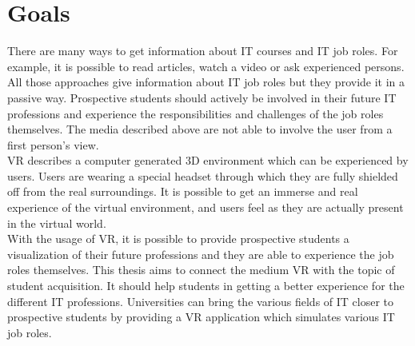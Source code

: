 \section{Goals}
There are many ways to get information about IT courses and IT job roles. For example, it is possible to read articles, watch a video or ask experienced persons. All those approaches give information about IT job roles but they provide it in a passive way. Prospective students should actively be involved in their future IT professions and experience the responsibilities and challenges of the job roles themselves. The media described above are not able to involve the user from a first person's view. \\
VR describes a computer generated 3D environment which can be experienced by users. Users are wearing a special headset through which they are fully shielded off from the real surroundings. It is possible to get an immerse and real experience of the virtual environment, and users feel as they are actually present in the virtual world. \cite{Linowes.2015}\\
With the usage of VR, it is possible to provide prospective students a visualization of their future professions and they are able to experience the job roles themselves. This thesis aims to connect the medium VR with the topic of student acquisition. It should help students in getting a better experience for the different IT professions. Universities can bring the various fields of IT closer to prospective students by providing a VR application which simulates various IT job roles.

